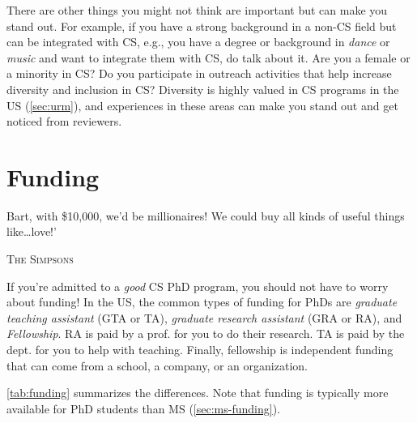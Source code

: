 \documentclass[oneside,11pt,dvipsnames]{book}
\def\chapterinfo#1{%
  \addcontentsline{toc}{chapterinfo}{%
    \noexpand\numberline{}\color{black}{#1}}%
}
\begin{document}
There are other things you might not think are important but can make you stand out. For example, if you have a strong background in a non-CS field but can be integrated with CS, e.g., you have a degree or background in \emph{dance} or \emph{music} and want to integrate them with CS, do talk about it. Are you a female or a minority in CS? Do you participate in outreach activities that help increase diversity and inclusion in CS? Diversity is highly valued in CS programs in the US (\autoref{sec:urm}), and experiences in these areas can make you stand out and get noticed from reviewers.

\chapter{Funding}\label{sec:funding}
\chapterinfo{TAs, RAs, and fellowships are main funding sources for PhDs.  TAs are provided by the department to help with classes. RAs are given by profs. to help with their research.  Fellowships, provided by the university, department, or external sources such as government or industry, give move flexibility but can be very competitive.}

\epigraph{Bart, with \$10,000, we’d be millionaires! We could buy all kinds of useful things like…love!’}{\textsc{The Simpsons}}

If you're admitted to a \emph{good} CS PhD program, you should not have to worry about funding!
In the US, the common types of funding for PhDs are \emph{graduate teaching assistant} (GTA or TA), \emph{graduate research assistant} (GRA or RA), and \emph{Fellowship}.
RA is paid by a prof. for you to do their research. TA is paid by the dept. for you to help with teaching. Finally, fellowship is independent funding that can come from a school, a company, or an organization. 

\autoref{tab:funding} summarizes the differences.
Note that funding is typically more available for PhD students than MS (\autoref{sec:ms-funding}).
\end{document}
